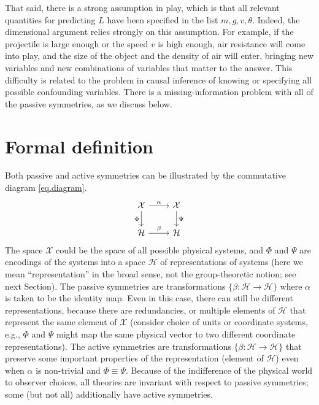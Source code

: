 \documentclass{article}
\theoremstyle{plain}
\theoremstyle{definition}
\theoremstyle{remark}
\begin{document}
That said, there is a strong assumption in play, which is that all relevant quantities for predicting $L$ have been specified in the list $m, g, v, \theta$.
Indeed, the dimensional argument relies strongly on this assumption.
For example, if the projectile is large enough or the speed $v$ is high enough, air resistance will come into play, and the size of the object and the density of air will enter, bringing new variables and new combinations of variables that matter to the answer.
This difficulty is related to the problem in causal inference of knowing or specifying all possible confounding variables.
There is a missing-information problem with all of the passive symmetries, as we discuss below.

\section{Formal definition}\label{sec:definitions}


Both passive and active symmetries can be illustrated by the commutative diagram \eqref{eq.diagram}. 
\begin{equation}\label{eq.diagram}
\begin{tikzcd}[]
  {\cal X}\arrow[r,"\alpha"] \arrow[d,"\Phi",swap] & {\cal X}  \arrow[d,"\Psi"]\\
{\cal H} \arrow[r,"\beta"]  & {\cal H} 
\end{tikzcd}
\end{equation}
The space $\mathcal X$ could be the space of all possible physical systems, and $\Phi$ and $\Psi$ are encodings of the systems into a space $\mathcal H$ of representations of systems (here we mean ``representation'' in the broad sense, not the group-theoretic notion; see next Section).
The passive symmetries are transformations $\{\beta:\mathcal H \to \mathcal H\}$ where $\alpha$ is taken to be the identity map.
Even in this case, there can still be different representations, because there are redundancies, or multiple elements of $\mathcal H$ that represent the same element of $\mathcal X$ (consider choice of units or coordinate systems, e.g., $\Phi$ and $\Psi$ might map the same physical vector to two different coordinate representations).
The active symmetries are transformations $\{\beta:\mathcal H \to \mathcal H\}$ that preserve some important properties of the representation (element of $\mathcal H$) even when $\alpha$ is non-trivial and $\Phi\equiv \Psi$.
Because of the indifference of the physical world to observer choices, all theories are invariant with respect to passive symmetries; some (but not all) additionally have active symmetries.
\end{document}
